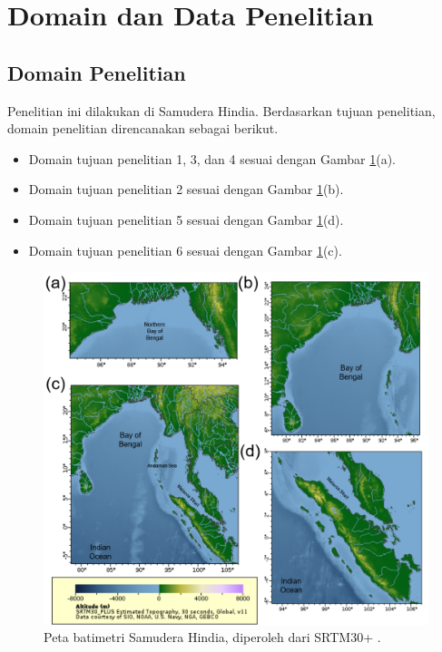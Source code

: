 \vspace{1.5pc}
\section[Domain dan Data Penelitian]{Domain dan Data Penelitian}
\begin{spacing}{1.5}
	\subsection[Domain Penelitian]{Domain Penelitian}
	Penelitian ini dilakukan di Samudera Hindia. Berdasarkan tujuan penelitian, domain penelitian direncanakan sebagai berikut.
	\begin{itemize}
		\item Domain tujuan penelitian 1, 3, dan 4 sesuai dengan Gambar \ref{fig:domain}(a).
		\item Domain tujuan penelitian 2 sesuai dengan Gambar \ref{fig:domain}(b).
		\item Domain tujuan penelitian 5 sesuai dengan Gambar \ref{fig:domain}(d).
		\item Domain tujuan penelitian 6 sesuai dengan Gambar \ref{fig:domain}(c).
	\end{itemize}
	\begin{figure}[H]
		\centering
		\includegraphics[width=12cm]{contents/Figures/Batimetri_edit_compress}
		\caption{Peta batimetri Samudera Hindia, diperoleh dari SRTM30+ \protect\cite{becker2009global}.}
		\label{fig:domain}
	\end{figure}

\end{spacing}
